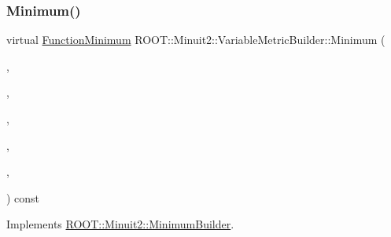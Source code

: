 \subsubsection{\texorpdfstring{Minimum()}{Minimum()}\hspace{0.1cm}{\footnotesize\ttfamily [1/4]}}
{\footnotesize\ttfamily virtual \mbox{\hyperlink{classROOT_1_1Minuit2_1_1FunctionMinimum}{Function\+Minimum}} R\+O\+O\+T\+::\+Minuit2\+::\+Variable\+Metric\+Builder\+::\+Minimum (\begin{DoxyParamCaption}\item[{const \mbox{\hyperlink{classROOT_1_1Minuit2_1_1MnFcn}{Mn\+Fcn}} \&}]{,  }\item[{const \mbox{\hyperlink{classROOT_1_1Minuit2_1_1GradientCalculator}{Gradient\+Calculator}} \&}]{,  }\item[{const \mbox{\hyperlink{classROOT_1_1Minuit2_1_1MinimumSeed}{Minimum\+Seed}} \&}]{,  }\item[{const \mbox{\hyperlink{classROOT_1_1Minuit2_1_1MnStrategy}{Mn\+Strategy}} \&}]{,  }\item[{unsigned int}]{,  }\item[{double}]{ }\end{DoxyParamCaption}) const\hspace{0.3cm}{\ttfamily [virtual]}}



Implements \mbox{\hyperlink{classROOT_1_1Minuit2_1_1MinimumBuilder_aefaa624436afa8195af1f3393a35981f}{R\+O\+O\+T\+::\+Minuit2\+::\+Minimum\+Builder}}.

\mbox{\label{classROOT_1_1Minuit2_1_1VariableMetricBuilder_a56d18a37b8643611ff80875b91915784}} 
